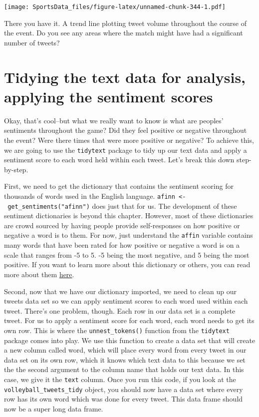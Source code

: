 \documentclass[
]{book}
\begin{document}
\texttt{[image: SportsData\_files/figure-latex/unnamed-chunk-344-1.pdf]}

There you have it. A trend line plotting tweet volume throughout the course of the event. Do you see any areas where the match might have had a significant number of tweets?

\hypertarget{tidying-the-text-data-for-analysis-applying-the-sentiment-scores}{%
\section{Tidying the text data for analysis, applying the sentiment scores}\label{tidying-the-text-data-for-analysis-applying-the-sentiment-scores}}

Okay, that's cool--but what we really want to know is what are peoples' sentiments throughout the game? Did they feel positive or negative throughout the event? Were there times that were more positive or negative? To achieve this, we are going to use the \texttt{tidytext} package to tidy up our text data and apply a sentiment score to each word held within each tweet. Let's break this down step-by-step.

First, we need to get the dictionary that contains the sentiment scoring for thousands of words used in the English language. \texttt{afinn\ \textless{}-\ get\_sentiments("afinn")} does just that for us. The development of these sentiment dictionaries is beyond this chapter. However, most of these dictionaries are crowd sourced by having people provide self-responses on how positive or negative a word is to them. For now, just understand the \texttt{affin} variable contains many words that have been rated for how positive or negative a word is on a scale that ranges from -5 to 5. -5 being the most negative, and 5 being the most positive. If you want to learn more about this dictionary or others, you can read more about them \href{https://www.tidytextmining.com/sentiment.html}{here}.

Second, now that we have our dictionary imported, we need to clean up our tweets data set so we can apply sentiment scores to each word used within each tweet. There's one problem, though. Each row in our data set is a complete tweet. For us to apply a sentiment score for each word, each word needs to get its own row. This is where the \texttt{unnest\_tokens()} function from the \texttt{tidytext} package comes into play. We use this function to create a data set that will create a new column called word, which will place every word from every tweet in our data set on its own row, which it knows which text data to this because we set the the second argument to the column name that holds our text data. In this case, we give it the \texttt{text} column. Once you run this code, if you look at the \texttt{volleyball\_tweets\_tidy} object, you should now have a data set where every row has its own word which was done for every tweet. This data frame should now be a super long data frame.
\end{document}
